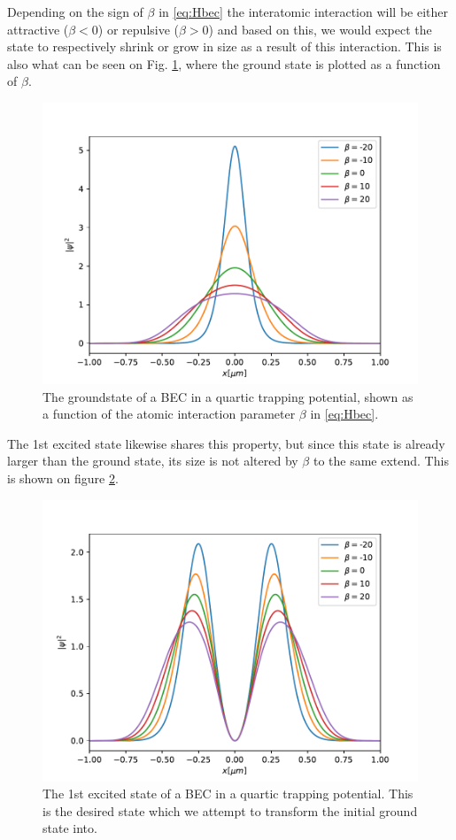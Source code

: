 \documentclass[aps,pra,reprint,superscriptaddress]{revtex4-1}
\begin{document}
Depending on the sign of $\beta$ in \eqref{eq:Hbec} the interatomic interaction will be either attractive ($\beta<0$) or repulsive ($\beta>0$) and based on this, we would expect the state to respectively shrink or grow in size as a result of this interaction. This is also what can be seen on Fig. \ref{fig:BECgroundstate}, where the ground state is plotted as a function of $\beta$.
\begin{figure}[h]
	\includegraphics[width=\columnwidth]{graphics/GroundstateBeta.pdf}
	\caption{The groundstate of a BEC in a quartic trapping potential, shown as a function of the atomic interaction parameter $\beta$ in \ref{eq:Hbec}.}
	\label{fig:BECgroundstate}
\end{figure}

The 1st excited state likewise shares this property, but since this state is already larger than the ground state, its size is not altered by $\beta$ to the same extend. This is shown on figure \ref{fig:BECexcitedstate}.
\begin{figure}
	\includegraphics[width=\columnwidth]{graphics/ExcitedstateBeta.pdf}
	\caption{The 1st excited state of a BEC in a quartic trapping potential. This is the desired state which we attempt to transform the initial ground state into.}
	\label{fig:BECexcitedstate}
\end{figure}
\end{document}
